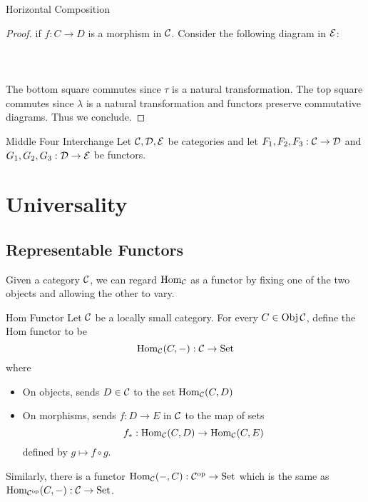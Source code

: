 \documentclass[a4paper]{article}
\begin{document}
\begin{prp}{Horizontal Composition}{}
\begin{proof}
if $f:C\to D$ is a morphism in $\mathcal{C}$. Consider the following diagram in $\mathcal{E}$: \\~\\
\\~\\
The bottom square commutes since $\tau$ is a natural transformation. The top square commutes since $\lambda$ is a natural transformation and functors preserve commutative diagrams. Thus we conclude. 
\end{proof}
\end{prp}

\begin{prp}{Middle Four Interchange}{} Let $\mathcal{C},\mathcal{D},\mathcal{E}$ be categories and let $F_1,F_2,F_3:\mathcal{C}\to\mathcal{D}$ and $G_1,G_2,G_3:\mathcal{D}\to\mathcal{E}$ be functors. 
\end{prp}


\pagebreak
\section{Universality}
\subsection{Representable Functors}
Given a category $\mathcal{C}$, we can regard $\operatorname{Hom}_{\mathcal{C}}$ as a functor by fixing one of the two objects and allowing the other to vary. 

\begin{defn}{Hom Functor}{} Let $\mathcal{C}$ be a locally small category. For every $C\in\operatorname{Obj}\mathcal{C}$, define the Hom functor to be $$\operatorname{Hom}_{\mathcal{C}}(C,-):\mathcal{C}\to\text{Set}$$ where 
\begin{itemize}
\item On objects, sends $D\in\mathcal{C}$ to the set $\operatorname{Hom}_{\mathcal{C}}(C,D)$
\item On morphisms, sends $f:D\to E$ in $\mathcal{C}$ to the map of sets $$f_\ast:\operatorname{Hom}_{\mathcal{C}}(C,D)\to\operatorname{Hom}_{\mathcal{C}}(C,E)$$ defined by $g\mapsto f\circ g$. 
\end{itemize}
Similarly, there is a functor $\operatorname{Hom}_{\mathcal{C}}(-,C):\mathcal{C}^{\text{op}}\to\text{Set}$ which is the same as $\operatorname{Hom}_{\mathcal{C}^{\text{op}}}(C,-):\mathcal{C}\to\text{Set}$. 
\end{defn}
\end{document}
